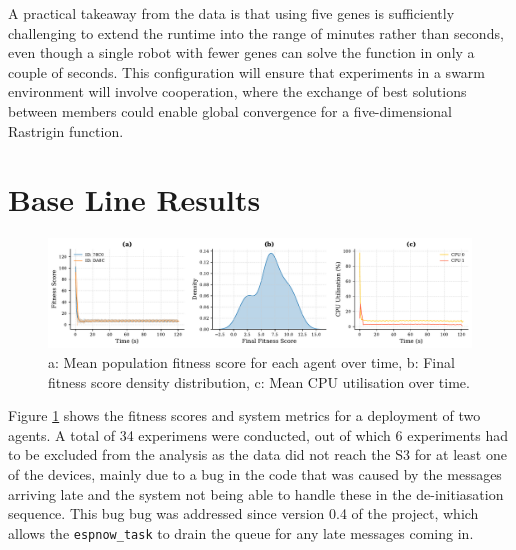 \documentclass[conference]{IEEEtran}
\begin{document}
A practical takeaway from the data is that using five genes is sufficiently challenging to extend the runtime into the range of minutes rather than seconds, even though a single robot with fewer genes can solve the function in only a couple of seconds. This configuration will ensure that experiments in a swarm environment will involve cooperation, where the exchange of best solutions between members could enable global convergence for a five-dimensional Rastrigin function.

\newpage
\section{Base Line Results}

\begin{figure}[t]
  \centering
  \includegraphics[width=1\textwidth]{base_fitness_stats.pdf}
  \caption{a: Mean population fitness score for each agent over time,  b: Final fitness score density distribution, c: Mean CPU utilisation over time.}
  \label{fig:base_fitness_stats}
\end{figure}

Figure \ref{fig:base_fitness_stats} shows the fitness scores and system metrics for a deployment of two agents. A total of 34 experimens were conducted, out of which 6 experiments had to be excluded from the analysis as the data did not reach the S3 for at least one of the devices, mainly due to a bug in the code that was caused by the messages arriving late and the system not being able to handle these in the de-initiasation sequence. This bug bug was addressed since version 0.4 of the project, which allows the \texttt{espnow\_task} to drain the queue for any late messages coming in.\\
\end{document}
